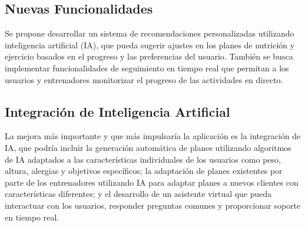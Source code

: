 \subsection{Nuevas Funcionalidades}
Se propone desarrollar un sistema de recomendaciones personalizadas utilizando inteligencia artificial (IA), que pueda sugerir ajustes en los planes de nutrición y ejercicio basados en el progreso y las preferencias del usuario. También se busca implementar funcionalidades de seguimiento en tiempo real que permitan a los usuarios y entrenadores monitorizar el progreso de las actividades en directo.

\subsection{Integración de Inteligencia Artificial}
La mejora más importante y que más impulsaría la aplicación es la integración de IA, que podría incluir la generación automática de planes utilizando algoritmos de IA adaptados a las características individuales de los usuarios como peso, altura, alergias y objetivos específicos; la adaptación de planes existentes por parte de los entrenadores utilizando IA para adaptar planes a nuevos clientes con características diferentes; y el desarrollo de un asistente virtual que pueda interactuar con los usuarios, responder preguntas comunes y proporcionar soporte en tiempo real.
